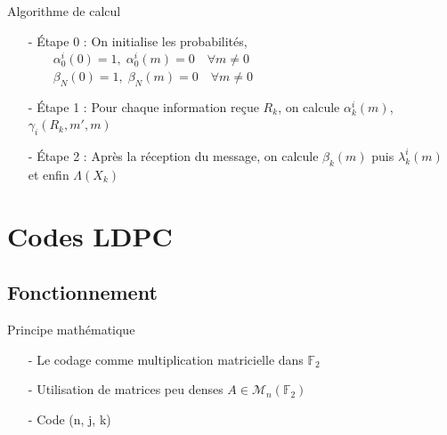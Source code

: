 \documentclass[11pt]{beamer}
\begin{document}
\begin{frame}{Algorithme de calcul}
	\begin{itemize}
		\item[-] \'Etape 0 : On initialise les probabilit\'es, \\
					$\qquad \alpha_0^i(0) = 1, \; \alpha_0^i(m) = 0 \quad \forall m \neq 0$\\
					$\qquad \beta_N(0) = 1, \; \beta_N(m) = 0 \quad \forall m \neq 0$
		\item[-] \'Etape 1 : Pour chaque information re\c{c}ue $R_k$, on calcule $\alpha_k^i(m)$, $\gamma_i(R_k, m', m)$
		\item[-] \'Etape 2 : Apr\`es la r\'eception du message, on calcule  $\beta_k(m)$ puis  $\lambda_k^i(m)$ et enfin $\Lambda(X_k)$
	\end{itemize}
\end{frame}


\section{Codes LDPC}
\subsection{Fonctionnement}


\begin{frame}{Principe math\'ematique}
	\begin{itemize}
		\item[-] Le codage comme multiplication matricielle dans $\mathbb{F}_2$
		\item[-] Utilisation de matrices peu denses $A \in \mathcal{M}_n(\mathbb{F}_2)$
		\item[-] Code (n, j, k)
	\end{itemize}
\end{frame}
\end{document}
